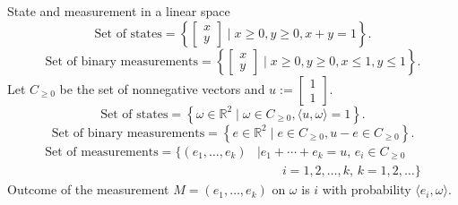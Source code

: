 \documentclass{beamer}
\newcommand\emm[1]{\textcolor{redorange}{{#1}}}
\theoremstyle{definition}
\begin{document}
\begin{frame}{State and measurement in a linear space}
\begin{equation*}
\text{Set of states} = \left\{\begin{bmatrix}x\\y\end{bmatrix}\mid x\ge 0, y\ge 0, x+y=1\right\}.
\end{equation*}
\begin{equation*}
\text{Set of binary measurements} = \left\{\begin{bmatrix}x\\y\end{bmatrix}\mid x\ge 0, y\ge 0, x\le 1, y\le 1\right\}.
\end{equation*}
Let $C_{\ge 0}$ be the set of nonnegative vectors and $u:=\begin{bmatrix}1\\1\end{bmatrix}$.
\begin{equation*}
\text{Set of states} = \left\{\omega\in\mathbb{R}^2 \mid \omega\in C_{\ge 0}, \langle u, \omega\rangle = 1\right\}.
\end{equation*}
\begin{equation*}
\text{Set of binary measurements} = \left\{e\in\mathbb{R}^2 \mid e\in C_{\ge 0}, u-e \in C_{\ge 0} \right\}.
\end{equation*}
\begin{align*}
\text{Set of measurements} = \{(e_1,\dotsc,e_k) &\mid e_1+\dotsb+e_k=u,\, e_i\in C_{\ge 0}\\
&\qquad i=1,2,\dotsc,k,\,k=1,2,\dotsc \}
\end{align*}
Outcome of the measurement $M=(e_1,\dotsc,e_k)$ on $\omega$ is $i$ with probability \emm{$\langle e_i, \omega\rangle$}.
\end{frame}
\end{document}

